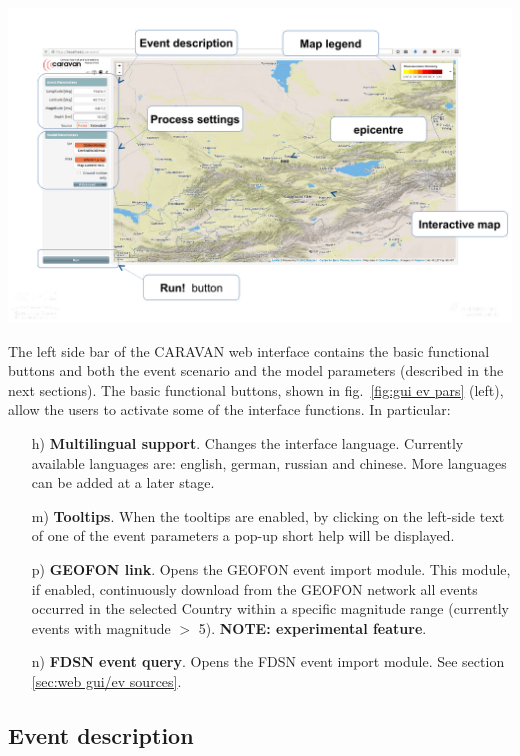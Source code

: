 \documentclass[12p]{article}
\begin{document}
\begin{center}
	\includegraphics[width=\textwidth]{caravan_web_gui1}
\end{center}

The left side bar of the CARAVAN web interface contains the basic functional
buttons and both the event scenario and the model parameters (described in the
next sections).
The basic functional buttons, shown in fig.~\ref{fig:gui ev pars} (left), allow
the users to activate some of the interface functions. In particular:

\begin{itemize}
	\item[h)]{\textbf{Multilingual support}. Changes the interface language.
Currently available languages are: english, german, russian and chinese. More
languages can be added at a later stage.}
	\item[m)]{\textbf{Tooltips}. When the tooltips are enabled, by clicking
on the left-side text of one of the event parameters a pop-up short help will be
displayed.}
	\item[p)]{\textbf{GEOFON link}. Opens the GEOFON event import module.
This module, if enabled, continuously download from the GEOFON network all
events occurred in the selected Country within a specific magnitude range
(currently events with magnitude $>$ 5). \textbf{NOTE: experimental feature}.}
	\item[n)]{\textbf{FDSN event query}. Opens the FDSN event import
module. See section \ref{sec:web gui/ev sources}.}
\end{itemize}

\subsection{Event description}
\label{sec:web gui/ev param}
\end{document}
